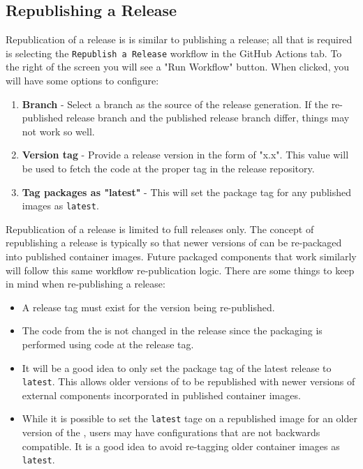 \subsection{Republishing a Release}\label{sec:republish}

Republication of a release is is similar to publishing a release;
all that is required is selecting the \texttt{Republish a Release}
workflow in the GitHub Actions tab.  To the right of the screen you will see
a "Run Workflow" button.  When clicked, you will have some options to configure:

\begin{enumerate}
    \item \textbf{Branch} - Select a branch as the source of the release generation.
    If the re-published release branch and the published release branch differ, things
    may not work so well.
    \item \textbf{Version tag} - Provide a release version in the form of "x.x".  
    This value will be used to fetch the code at the proper tag in the release
    repository.
    \item \textbf{Tag packages as "latest"} - This will set the package tag
    for any published images as \texttt{latest}. 
\end{enumerate}

Republication of a release is limited to full releases only.  The concept of
republishing a release is typically so that newer versions of \cxflow can be
re-packaged into \cxflowplusplus published container images.  Future packaged
components that work similarly will follow this same workflow re-publication
logic.  There are  some things to keep in mind when re-publishing a release:

\begin{itemize}
    \item A release tag must exist for the version being re-published.
    \item The code from the \cxtoolkit is not changed in the release since
    the packaging is performed using code at the release tag.
    \item It will be a good idea to only set the package tag of the latest
    release to \texttt{latest}.  This allows older versions of \cxtoolkit
    to be republished with newer versions of external components incorporated
    in published container images.
    \item While it is possible to set the \texttt{latest} tage on a republished
    image for an older version of the \cxtoolkit, users may have configurations
    that are not backwards compatible.  It is a good idea to avoid re-tagging
    older container images as \texttt{latest}.
\end{itemize}

